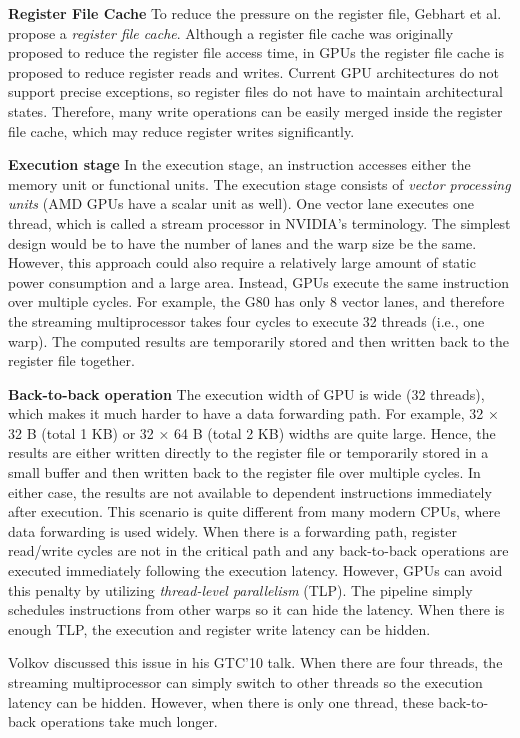 \documentclass[twocolumn]{article}
\begin{document}
\noindent
\textbf{Register File Cache} 
To reduce the pressure on the register file, Gebhart et al. propose a \textit{register file cache}. Although a register file cache was originally proposed to reduce the register file access time, in GPUs the register file cache is proposed to reduce register reads and writes. Current GPU architectures do not support precise exceptions, so register files do not have to maintain architectural states. Therefore, many write operations can be easily merged inside the register file cache, which may reduce register writes significantly.

\noindent
\textbf{Execution stage}
In the execution stage, an instruction accesses either the memory unit or functional units. 
The execution stage consists of \textit{vector processing units} (AMD GPUs have a scalar unit as well). One vector lane executes one thread, which is called a stream processor in NVIDIA's terminology. The simplest design would be to have the number of lanes and the warp size be the same. However, this approach could also require a relatively large amount of static power consumption and a large area. Instead, GPUs execute the same instruction over multiple cycles. For example, the G80 has only 8 vector lanes, and therefore the streaming multiprocessor takes four cycles to execute 32 threads (i.e., one warp). The computed results are temporarily stored and then written back to the register file together.

\noindent
\textbf{Back-to-back operation} 
The execution width of GPU is wide (32 threads), which makes it much harder to have a data forwarding path. For example, 32 × 32 B (total 1 KB) or 32 × 64 B (total 2 KB) widths are quite large. Hence, the results are either written directly to the register file or temporarily stored in a small buffer and then written back to the register file over multiple cycles. In either case, the results are not available to dependent instructions immediately after execution. This scenario is quite different from many modern CPUs, where data forwarding is used widely. When there is a forwarding path, register read/write cycles are not in the critical path and any back-to-back operations are executed immediately following the execution latency. However, GPUs can avoid this penalty by utilizing \textit{thread-level parallelism} (TLP). The pipeline simply schedules instructions from other warps so it can hide the latency. When there is enough TLP, the execution and register write latency can be hidden.

Volkov discussed this issue in his GTC'10 talk. When there are four threads, the streaming multiprocessor can simply switch to other threads so the execution latency can be hidden. However, when there is only one thread, these back-to-back operations take much longer. 
\end{document}
